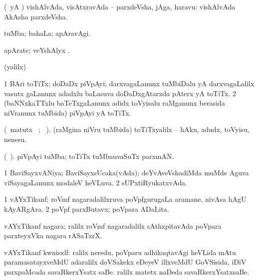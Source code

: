 \bentry
{} 
\gl{\nA}
\expl{}
\bmng
 (\kAparx\ yA \rUpa) vishAlvAda, visAtxravAda -- parxdeVsha, jAga, haravu:  vishAlvAda AkAsha parxdeVsha. 
\emng
\eentry


\bentry
{} 
\gl{\kirxvi}
\expl{}
\bmng
 tuMba; bahaLa; apAravAgi. 
\emng
\eentry

\bentry
{} 
\gl{\nA}
\expl{}
\bmng
 apArate; veYshAlyx 
\emng
. \eentry

\bentry
{} 
\gl{\saMkiSx}
\expl{}
\bmng
(\UK yalilx)  
\emng
\eentry

\bentry
{} 
\gl{\nA}
\expl{}
\bmng
\bnum
\num{1} BAri toTiTx; doDaDx piVpAyi; darxvagaLanunx tuMbiDalu yA darxvagaLalilx vasutx gaLanunx adadxlu baLasuva doDaDxgAtarxda pAterx yA toTiTx. 
\num{2} (baNNxkaTTxlu baTeTxgaLanunx adidx toVyisalu raMganunx berasida niVranunx tuMbida) piVpAyi yA toTiTx. 
\enum
\emng
\eentry

\bentry
{} 
\gl{\sakirx}(\BU\ matutx \BUkaq\ ; \vakaq\ ). 
\bmng
 (raMgina niVru tuMbida) toTiTxyalilx -- hAku, adudx, toVyisu, nenesu. 
\emng
\eentry

\bentry
{} 
\gl{\nA}(\bava\ ). 
\bmng
piVpAyi tuMba; toTiTx tuMbauvaSuTx parxmAN. 
\emng
\eentry

\bentry
{} 
\gl{\gu}
\expl{}
\bmng
\bnum
\num{1} BaviSayxvANiya; BaviSayxsUcaka(vAda); deYvAveVshadiMda muMde Aguva viSayagaLanunx modaleV heVLuva. 
\num{2} sUPxtiRyukatxvAda. 
\enum
\emng
\eentry

\bentry
{} 
\gl{\nA}
\expl{}
\bmng
\bnum
\num{1} vAYxTikanf; roVmf nagaradalilxruva poVpfgurugaLa aramane, nivAsa hAgU kAyARgAra. 
\num{2} poVpf parxButavx; poVpara ADaLita. 
\enum
\emng
\eentry

\bentry
{}
\gl{\nA}
\expl{}
\bmng
 vAYxTikanf nagara; ralilx roVmf nagaradalilx sAthxpitavAda poVpara parxteyxVka nagara rASaTxrX. 
\emng
\eentry

\bentry
{}
\gl{\nA}
\expl{}
\bmng
 vAYxTikanf kwnisxlf: 
\banum
{} ralilx neredu, poVparu adhikaqtavAgi heVLida mAtu paramasatayxveMdU adaralilx doVSakekx eDeyeV illxveMdU GoVSisida, iDiV parxpaMcada savaRkerxYsatx saBe. 
 ralilx matetx naDeda savaRkerxYsatxsaBe. 
\eanum
\emng
\eentry

